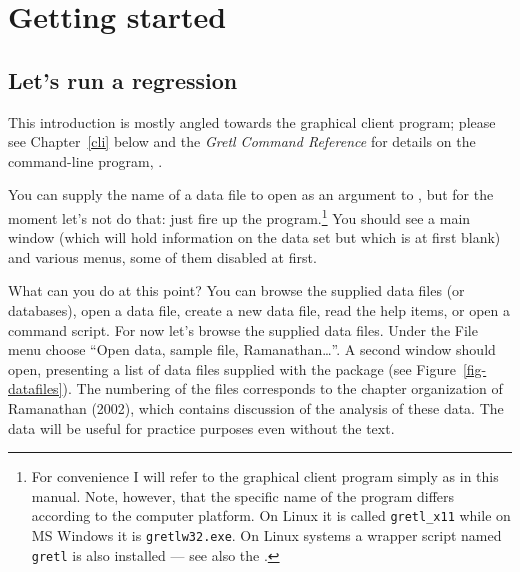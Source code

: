 \chapter{Getting started}
\label{getting-started}


\section{Let's run a regression}
\label{starting-regression}

This introduction is mostly angled towards the graphical client
program; please see Chapter~\ref{cli} below and the \emph{Gretl Command
  Reference} for details on the command-line program, .
    
You can supply the name of a data file to open as an argument to
, but for the moment let's not do that: just fire up the
program.\footnote{For convenience I will refer to the graphical client
  program simply as  in this manual. Note, however, that
  the specific name of the program differs according to the computer
  platform.  On Linux it is called \verb+gretl_x11+ while on MS
  Windows it is \verb+gretlw32.exe+. On Linux systems a wrapper script
  named \verb+gretl+ is also installed --- see also the \GCR.}  You
should see a main window (which will hold information on the data set
but which is at first blank) and various menus, some of them disabled
at first.
    
What can you do at this point?  You can browse the supplied data files
(or databases), open a data file, create a new data file, read the
help items, or open a command script.  For now let's browse the
supplied data files.  Under the File menu choose ``Open data, sample
file, Ramanathan\dots{}''.  A second window should open, presenting a
list of data files supplied with the package (see
Figure~\ref{fig-datafiles}).  The numbering of the files corresponds
to the chapter organization of Ramanathan (2002), which contains
discussion of the analysis of these data. The data will be useful for
practice purposes even without the text.
    
